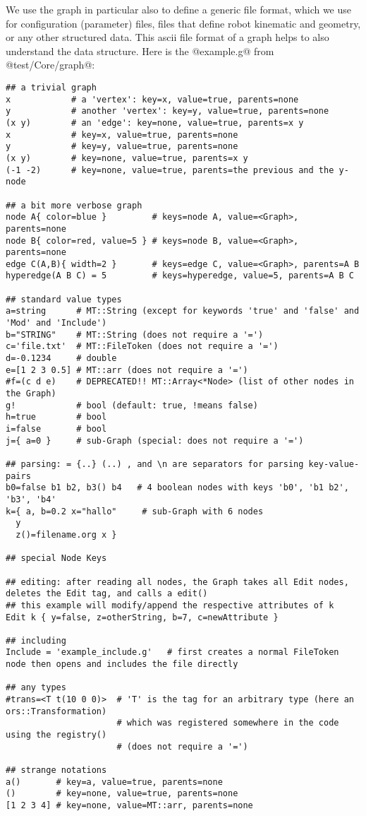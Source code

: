 \documentclass[10pt,fleqn,twoside]{article}
\begin{document}
We use the graph in particular also to define a generic file format,
which we use for configuration (parameter) files, files that define
robot kinematic and geometry, or any other structured data. This ascii
file format of a graph helps to also understand the data
structure. Here is the @example.g@ from @test/Core/graph@:
\begin{shaded}
\begin{Verbatim}[fontfamily=courier,fontsize=\tiny]
## a trivial graph
x            # a 'vertex': key=x, value=true, parents=none
y            # another 'vertex': key=y, value=true, parents=none
(x y)        # an 'edge': key=none, value=true, parents=x y
x            # key=x, value=true, parents=none
y            # key=y, value=true, parents=none
(x y)        # key=none, value=true, parents=x y
(-1 -2)      # key=none, value=true, parents=the previous and the y-node

## a bit more verbose graph
node A{ color=blue }         # keys=node A, value=<Graph>, parents=none
node B{ color=red, value=5 } # keys=node B, value=<Graph>, parents=none
edge C(A,B){ width=2 }       # keys=edge C, value=<Graph>, parents=A B
hyperedge(A B C) = 5         # keys=hyperedge, value=5, parents=A B C

## standard value types
a=string      # MT::String (except for keywords 'true' and 'false' and 'Mod' and 'Include')
b="STRING"    # MT::String (does not require a '=')
c='file.txt'  # MT::FileToken (does not require a '=')
d=-0.1234     # double
e=[1 2 3 0.5] # MT::arr (does not require a '=')
#f=(c d e)    # DEPRECATED!! MT::Array<*Node> (list of other nodes in the Graph)
g!            # bool (default: true, !means false)
h=true        # bool
i=false       # bool
j={ a=0 }     # sub-Graph (special: does not require a '=')

## parsing: = {..} (..) , and \n are separators for parsing key-value-pairs
b0=false b1 b2, b3() b4   # 4 boolean nodes with keys 'b0', 'b1 b2', 'b3', 'b4'
k={ a, b=0.2 x="hallo"     # sub-Graph with 6 nodes
  y
  z()=filename.org x }

## special Node Keys

## editing: after reading all nodes, the Graph takes all Edit nodes, deletes the Edit tag, and calls a edit()
## this example will modify/append the respective attributes of k
Edit k { y=false, z=otherString, b=7, c=newAttribute }

## including
Include = 'example_include.g'   # first creates a normal FileToken node then opens and includes the file directly

## any types
#trans=<T t(10 0 0)>  # 'T' is the tag for an arbitrary type (here an ors::Transformation)
                      # which was registered somewhere in the code using the registry()
                      # (does not require a '=')

## strange notations
a()       # key=a, value=true, parents=none
()        # key=none, value=true, parents=none
[1 2 3 4] # key=none, value=MT::arr, parents=none
\end{Verbatim}
\end{shaded}
\end{document}
